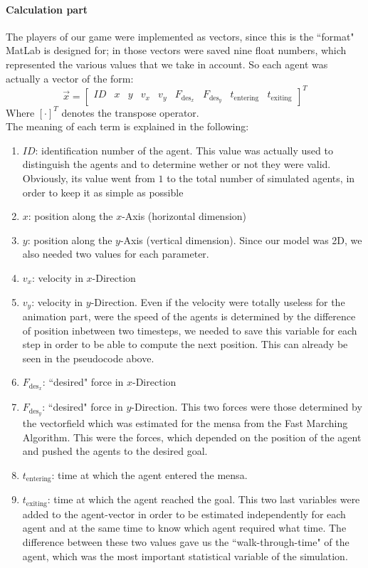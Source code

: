 \documentclass[11pt]{article}
\newcommand{\Mx}[1]{\begin{bmatrix}#1\end{bmatrix}}
\begin{document}
\paragraph{Calculation part}
The players of our game were implemented as vectors, since this is the ``format" MatLab is designed for; in those vectors  were saved nine float numbers, which represented the various values that we take in account. So each agent was actually a vector of the form:
\begin{equation*}
	\vec{x} = \Mx{ID & x & y & v_x & v_y & F_{\text{des}_x} & F_{\text{des}_y} & t_\text{entering} & t_\text{exiting}}^T
\end{equation*}
Where $[\cdot]^T$ denotes the transpose operator.\\
The meaning of each term is explained in the following:
\begin{enumerate}
	\item $ID$: identification number of the agent. This value was actually used to distinguish the agents and to determine wether or not they were valid. Obviously, its value went from $1$ to the total number of simulated agents, in order to keep it as simple as possible
	\item $x$: position along the $x$-Axis (horizontal dimension)
	\item $y$: position along the $y$-Axis (vertical dimension). Since our model was 2D, we also needed two values for each parameter.
	\item $v_x$: velocity in $x$-Direction
	\item $v_y$: velocity in $y$-Direction. Even if the velocity were totally useless for the animation part, were the speed of the agents is determined by the difference of position inbetween two timesteps, we needed to save this variable for each step in order to be able to compute the next position. This can already be seen in the pseudocode above.
	\item $F_{\text{des}_x}$: ``desired" force in $x$-Direction
	\item $F_{\text{des}_y}$: ``desired" force in $y$-Direction. This two forces were those determined by the vectorfield which was estimated for the mensa from the Fast Marching Algorithm. This were the forces, which depended on the position of the agent and pushed the agents to the desired goal.
	\item $t_\text{entering}$: time at which the agent entered the mensa.
	\item $t_\text{exiting}$: time at which the agent reached the goal. This two last variables were added to the agent-vector in order to be estimated independently for each agent and at the same time to know which agent required what time. The difference between these two values gave us the ``walk-through-time" of the agent, which was the most important statistical variable of the simulation.
\end{enumerate}
\end{document}
